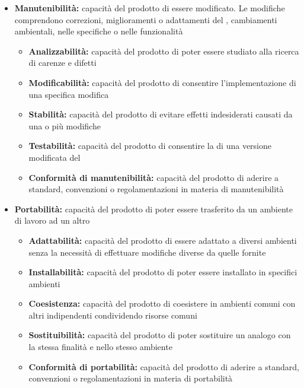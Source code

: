 \documentclass[12pt,a4paper]{article}
\begin{document}
\begin{itemize}
		\item \textbf{Manutenibilità:} capacità del prodotto  di essere modificato. Le modifiche comprendono correzioni, miglioramenti o adattamenti del , cambiamenti ambientali, nelle specifiche o nelle funzionalità
		\begin{itemize}
			\item \textbf{Analizzabilità:} capacità del prodotto  di poter essere studiato alla ricerca di carenze e difetti
			\item \textbf{Modificabilità:} capacità del prodotto  di consentire l'implementazione di una specifica modifica
			\item \textbf{Stabilità:} capacità del prodotto  di evitare effetti indesiderati causati da una o più modifiche
			\item \textbf{Testabilità:} capacità del prodotto  di consentire la  di una versione modificata del  
			\item \textbf{Conformità di manutenibilità:} capacità del prodotto  di aderire a standard, convenzioni o regolamentazioni in materia di manutenibilità
		\end{itemize}
		
		\item \textbf{Portabilità:} capacità del prodotto  di poter essere trasferito da un ambiente di lavoro ad un altro
		\begin{itemize}
			\item \textbf{Adattabilità:} capacità del prodotto  di essere adattato a diversi ambienti senza la necessità di effettuare modifiche diverse da quelle fornite
			\item \textbf{Installabilità:} capacità del prodotto  di poter essere installato in specifici ambienti
			\item \textbf{Coesistenza:} capacità del prodotto  di coesistere in ambienti comuni con altri   indipendenti condividendo risorse comuni
			\item \textbf{Sostituibilità:} capacità del prodotto  di poter sostituire un  analogo con la stessa finalità e nello stesso ambiente
			\item \textbf{Conformità di portabilità:} capacità del prodotto  di aderire a standard, convenzioni o regolamentazioni in materia di portabilità
		\end{itemize}
	\end{itemize}
	
\end{document}

